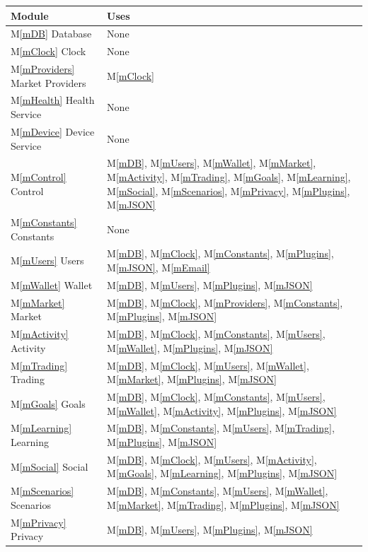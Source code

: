 \documentclass[12pt, titlepage]{article}
\newcommand{\mref}[1]{M\ref{#1}}
\begin{document}
\begin{table}[H]
\centering
\begin{tabular}{p{} p{}}
\toprule
\textbf{Module} & \textbf{Uses}\\
\midrule
\mref{mDB} Database & None\\
\mref{mClock} Clock & None\\
\mref{mProviders} Market Providers & \mref{mClock}\\
\mref{mHealth} Health Service & None\\
\mref{mDevice} Device Service & None\\
\mref{mControl} Control & \mref{mDB}, \mref{mUsers}, \mref{mWallet}, \mref{mMarket}, \mref{mActivity}, \mref{mTrading}, \mref{mGoals}, \mref{mLearning}, \mref{mSocial}, \mref{mScenarios}, \mref{mPrivacy}, \mref{mPlugins}, \mref{mJSON}\\
\mref{mConstants} Constants & None\\
\mref{mUsers} Users & \mref{mDB}, \mref{mClock}, \mref{mConstants}, \mref{mPlugins}, \mref{mJSON}, \mref{mEmail}\\
\mref{mWallet} Wallet & \mref{mDB}, \mref{mUsers}, \mref{mPlugins}, \mref{mJSON}\\
\mref{mMarket} Market & \mref{mDB}, \mref{mClock}, \mref{mProviders}, \mref{mConstants}, \mref{mPlugins}, \mref{mJSON}\\
\mref{mActivity} Activity & \mref{mDB}, \mref{mClock}, \mref{mConstants}, \mref{mUsers}, \mref{mWallet}, \mref{mPlugins}, \mref{mJSON}\\
\mref{mTrading} Trading & \mref{mDB}, \mref{mClock}, \mref{mUsers}, \mref{mWallet}, \mref{mMarket}, \mref{mPlugins}, \mref{mJSON}\\
\mref{mGoals} Goals & \mref{mDB}, \mref{mClock}, \mref{mConstants}, \mref{mUsers}, \mref{mWallet}, \mref{mActivity}, \mref{mPlugins}, \mref{mJSON}\\
\mref{mLearning} Learning & \mref{mDB}, \mref{mConstants}, \mref{mUsers}, \mref{mTrading}, \mref{mPlugins}, \mref{mJSON}\\
\mref{mSocial} Social & \mref{mDB}, \mref{mClock}, \mref{mUsers}, \mref{mActivity}, \mref{mGoals}, \mref{mLearning}, \mref{mPlugins}, \mref{mJSON}\\
\mref{mScenarios} Scenarios & \mref{mDB}, \mref{mConstants}, \mref{mUsers}, \mref{mWallet}, \mref{mMarket}, \mref{mTrading}, \mref{mPlugins}, \mref{mJSON}\\
\mref{mPrivacy} Privacy & \mref{mDB}, \mref{mUsers}, \mref{mPlugins}, \mref{mJSON}\\

\end{tabular}
\end{table}
\end{document}
